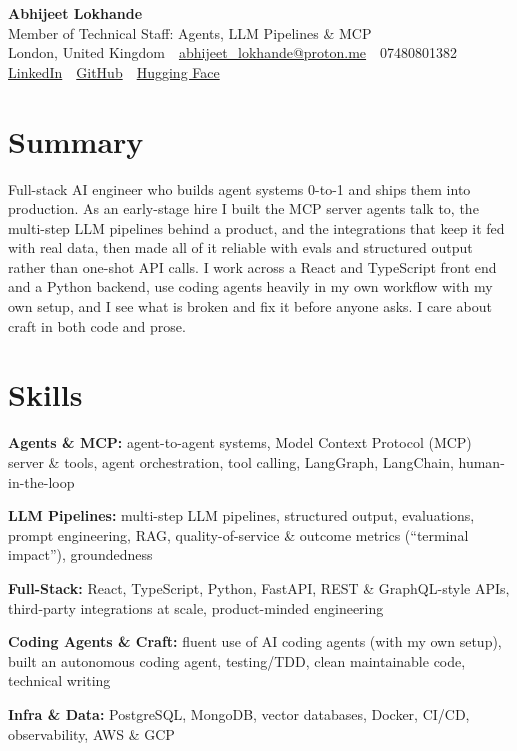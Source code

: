 \documentclass[10pt,a4paper]{article}
\newcommand{\sep}{\,\textcolor{accent!60}{\textbar}\,}
\begin{document}
\begin{center}
  {\fontsize{24}{26}\selectfont\bfseries Abhijeet Lokhande}\\[3pt]
  {\color{accent}\large Member of Technical Staff: Agents, LLM Pipelines \& MCP}\\[5pt]
  {\small
    London, United Kingdom \sep
    \href{mailto:abhijeet_lokhande@proton.me}{abhijeet\_lokhande@proton.me} \sep
    07480801382 \\[2pt]
    \href{https://www.linkedin.com/in/ablds/}{LinkedIn} \sep
    \href{https://github.com/abhijeetscode}{GitHub} \sep
    \href{https://huggingface.co/ab-ai}{Hugging Face}
  }
\end{center}
\vspace{2pt}

\section{Summary}
Full-stack AI engineer who builds agent systems 0-to-1 and ships them into production. As an early-stage hire I built the MCP server agents talk to, the multi-step LLM pipelines behind a product, and the integrations that keep it fed with real data, then made all of it reliable with evals and structured output rather than one-shot API calls. I work across a React and TypeScript front end and a Python backend, use coding agents heavily in my own workflow with my own setup, and I see what is broken and fix it before anyone asks. I care about craft in both code and prose.

\section{Skills}
\begin{tight}
  \item[\textcolor{accent}{\small$\bullet$}] \textbf{Agents \& MCP:} agent-to-agent systems, Model Context Protocol (MCP) server \& tools, agent orchestration, tool calling, LangGraph, LangChain, human-in-the-loop
  \item[\textcolor{accent}{\small$\bullet$}] \textbf{LLM Pipelines:} multi-step LLM pipelines, structured output, evaluations, prompt engineering, RAG, quality-of-service \& outcome metrics (``terminal impact''), groundedness
  \item[\textcolor{accent}{\small$\bullet$}] \textbf{Full-Stack:} React, TypeScript, Python, FastAPI, REST \& GraphQL-style APIs, third-party integrations at scale, product-minded engineering
  \item[\textcolor{accent}{\small$\bullet$}] \textbf{Coding Agents \& Craft:} fluent use of AI coding agents (with my own setup), built an autonomous coding agent, testing/TDD, clean maintainable code, technical writing
  \item[\textcolor{accent}{\small$\bullet$}] \textbf{Infra \& Data:} PostgreSQL, MongoDB, vector databases, Docker, CI/CD, observability, AWS \& GCP
\end{tight}
\end{document}
